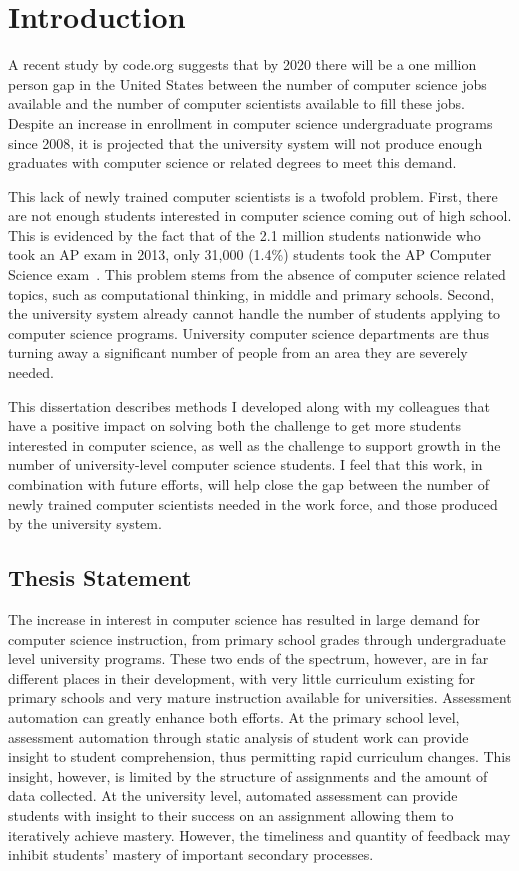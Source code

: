 \chapter{Introduction} \label{chap:introduction}
A recent study by code.org suggests that by 2020 there will be a one million
person gap in the United States between the number of computer science jobs
available and the number of computer scientists available to fill these
jobs. Despite an increase in enrollment in computer science undergraduate
programs since 2008, it is projected that the university system will not
produce enough graduates with computer science or related degrees to meet this
demand.

This lack of newly trained computer scientists is a twofold problem. First,
there are not enough students interested in computer science coming out of high
school. This is evidenced by the fact that of the 2.1 million students
nationwide who took an AP exam in 2013, only 31,000 (1.4\%) students took the
AP Computer Science exam~\cite{cb:2013}. This problem stems from the absence of
computer science related topics, such as computational thinking, in middle and
primary schools. Second, the university system already cannot handle the number
of students applying to computer science programs. University computer science
departments are thus turning away a significant number of people from an area
they are severely needed.

This dissertation describes methods I developed along with my colleagues that
have a positive impact on solving both the challenge to get more students
interested in computer science, as well as the challenge to support growth in
the number of university-level computer science students. I feel that this
work, in combination with future efforts, will help close the gap between the
number of newly trained computer scientists needed in the work force, and those
produced by the university system.

\section{Thesis Statement}
The increase in interest in computer science has resulted in large demand for
computer science instruction, from primary school grades through undergraduate
level university programs. These two ends of the spectrum, however, are in far
different places in their development, with very little curriculum existing for
primary schools and very mature instruction available for
universities. Assessment automation can greatly enhance both efforts. At the
primary school level, assessment automation through static analysis of student
work can provide insight to student comprehension, thus permitting rapid
curriculum changes. This insight, however, is limited by the structure of
assignments and the amount of data collected. At the university level,
automated assessment can provide students with insight to their success on an
assignment allowing them to iteratively achieve mastery. However, the
timeliness and quantity of feedback may inhibit students' mastery of important
secondary processes.

